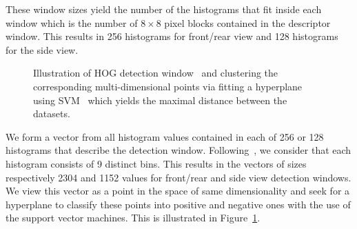 These window sizes yield the number of the histograms that fit inside each
window which is the number of $8 \times 8$ pixel blocks contained in the
descriptor window. This results in 256 histograms for front/rear view and 128
histograms for the side view.

\begin{figure}[t]%
\centering
{}
\caption{Illustration of HOG detection window~ and clustering the corresponding multi-dimensional points via fitting a hyperplane using SVM~ which yields the maximal distance between the datasets.}
\label{fig:det_to_svm}
\end{figure}

We form a vector from all histogram values contained in each of 256 or 128
histograms that describe the detection window. Following~\citet{dalal2005}, we
consider that each histogram consists of 9 distinct bins. This results in the
vectors of sizes respectively 2304 and 1152 values for front/rear and side
view detection windows. We view this vector as a point in the space of same
dimensionality and seek for a hyperplane to classify these points into
positive and negative ones with the use of the support vector machines. This
is illustrated in Figure~\ref{fig:det_to_svm}.

